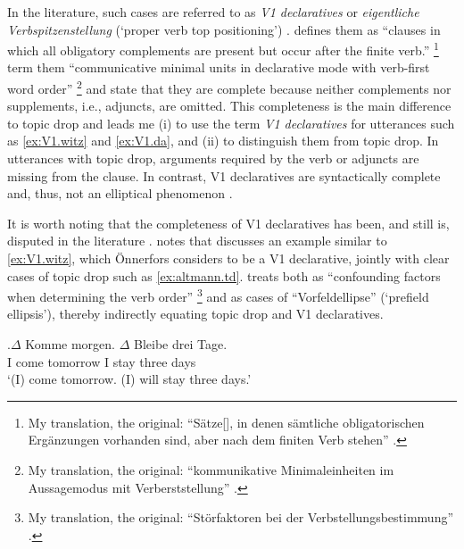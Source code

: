 In the literature, such cases are referred to as \textit{V1 declaratives} \citep{oennerfors1997, reis2000, schwitalla2012, schalowski2015} or \textit{eigentliche Verbspitzenstellung} (`proper verb top positioning') \citep{auer1993,imo2013}.
\citet[195]{auer1993} defines them as ``clauses in which all obligatory complements are present but occur after the finite verb.''%
\footnote{My translation, the original: ``Sätze[], in denen sämtliche obligatorischen Ergänzungen vorhanden sind, aber nach dem finiten Verb stehen'' \citep[195]{auer1993}.}
%
\citet[637]{zifonun.etal1997} term them ``communicative minimal units in declarative mode with verb-first word order''%
\footnote{My translation, the original: ``kommunikative Minimaleinheiten im Aussagemodus mit Verberststellung'' \citep[637]{zifonun.etal1997}.}
%
and state that they are complete because neither complements nor supplements, i.e., adjuncts,  are omitted.
This completeness is the main difference to topic drop and leads me (i) to use the term \textit{V1 declaratives} for utterances such as \ref{ex:V1.witz} and \ref{ex:V1.da}, and (ii) to distinguish them from topic drop.
In utterances with topic drop, arguments  required by the verb or adjuncts  are missing from the clause.
In contrast, V1 declaratives are syntactically complete and, thus, not an elliptical phenomenon \citep{oennerfors1997}.

It is worth noting that the completeness of V1 declaratives has been, and still is, disputed in the literature \citep[see][13--18, for an overview since the 19th century]{oennerfors1997}.
\citet[49--50]{oennerfors1997} notes that \citet[33]{altmann1987} discusses an example similar to \ref{ex:V1.witz}, which Önnerfors considers to be a V1 declarative, jointly with clear cases of topic drop such as \ref{ex:altmann.td}.
\citet[33]{altmann1987} treats both as ``confounding factors when determining the verb order''%
\footnote{My translation, the original: ``Störfaktoren bei der Verbstellungsbestimmung'' \citep[33]{altmann1987}.}
%
and as cases of ``Vorfeldellipse'' (`prefield ellipsis'), thereby indirectly equating topic drop and V1 declaratives.

\exg.\label{ex:altmann.td}$\Delta$ Komme morgen. $\Delta$ Bleibe drei Tage.\\
I come tomorrow I stay three days\\
`(I) come tomorrow. (I) will stay three days.' \citep[33]{altmann1987}


